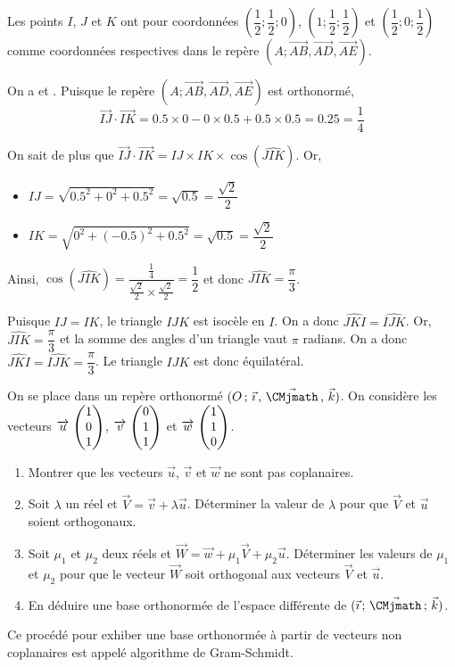 \documentclass[11pt,fleqn, openany]{book} %
\begin{document}
\begin{solution}Les points $I$, $J$ et $K$  ont pour coordonnées $\left( \dfrac{1}{2};\dfrac{1}{2};0\right)$, $\left(1;\dfrac{1}{2};\dfrac{1}{2}\right)$ et $\left( \dfrac{1}{2} ; 0;\dfrac{1}{2}\right)$ comme coordonnées respectives dans le repère $(A;\overrightarrow{AB},\overrightarrow{AD},\overrightarrow{AE})$.

On a  et . Puisque le repère $(A;\overrightarrow{AB},\overrightarrow{AD},\overrightarrow{AE})$ est orthonormé,
\[ \overrightarrow{IJ}\cdot \overrightarrow{IK}=0.5 \times 0 - 0 \times 0.5 + 0.5 \times 0.5 = 0.25 = \dfrac{1}{4} \]

On sait de plus que $\overrightarrow{IJ} \cdot \overrightarrow{IK}=IJ \times IK \times \cos (\widehat{JIK})$. Or,
\begin{itemize}
\item $IJ=\sqrt{0.5^2+0^2+0.5^2}=\sqrt{0.5}=\dfrac{\sqrt{2}}{2}$
\item $IK=\sqrt{0^2+(-0.5)^2+0.5^2}=\sqrt{0.5}=\dfrac{\sqrt{2}}{2}$
\end{itemize}
Ainsi, $\cos (\widehat{JIK})=\dfrac{\frac{1}{4}}{\frac{\sqrt{2}}{2}\times \frac{\sqrt{2}}{2}}=\dfrac{1}{2}$ et donc $\widehat{JIK}=\dfrac{\pi}{3}$.

 Puisque $IJ=IK$, le triangle $IJK$ est isocèle en $I$. On a donc  $\widehat{JKI}=\widehat{IJK}$. Or, $\widehat{JIK}=\dfrac{\pi}{3}$ et la somme des angles d'un triangle vaut $\pi$ radians. On a donc $\widehat{JKI}=\widehat{IJK}=\dfrac{\pi}{3}$. Le triangle $IJK$ est donc équilatéral.\end{solution}
 
\begin{exercise}On se place dans un repère orthonormé $\Oijk$. On considère les vecteurs $\coorde{u}{1}{0}{1}$, $\coorde{v}{0}{1}{1}$ et $\coorde{w}{1}{1}{0}$.
\begin{enumerate}
\item Montrer que les vecteurs $\vec u$, $\vec v$ et $\vec w$ ne sont pas coplanaires.
\item Soit $\lambda$ un réel et $\vec V = \vec v + \lambda \vec u$. Déterminer la valeur de $\lambda$ pour que $\vec V$ et $\vec u$ soient orthogonaux.
\item Soit $\mu_1$ et $\mu_2$ deux réels et $\vec W = \vec w + \mu_1 \vec V + \mu_2 \vec u$. Déterminer les valeurs de $\mu_1$ et $\mu_2$ pour que le vecteur $\vec W$ soit orthogonal aux vecteurs $\vec V$ et $\vec u$.
\item En déduire une base orthonormée de l'espace différente de $(\vec{\imath}\, ;\, \vec{\CMjmath} \,;\, \vec k)$.
\end{enumerate}
Ce procédé pour exhiber une base orthonormée à partir de vecteurs non coplanaires est appelé algorithme de Gram-Schmidt.\end{exercise}
\end{document}
